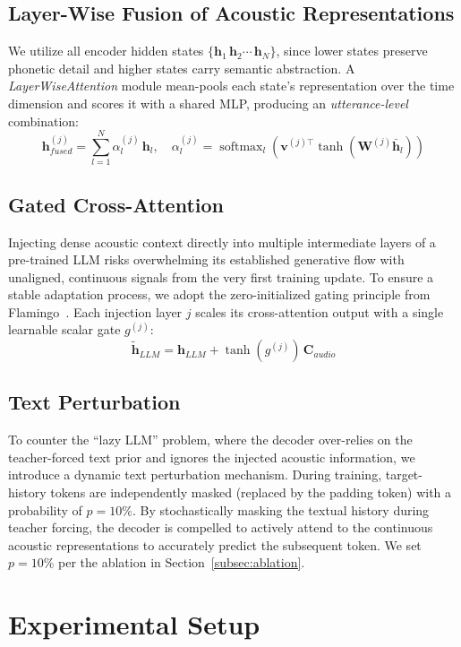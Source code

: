 \documentclass{article}
\begin{document}
\subsection{Layer-Wise Fusion of Acoustic Representations}
\noindent
We utilize all encoder hidden states $\{\boldsymbol{h}_1 \, \boldsymbol{h}_2 \cdots \, \boldsymbol{h}_N\}$, since lower states preserve phonetic detail and higher states carry semantic abstraction. A \textit{LayerWiseAttention} module mean-pools each state's representation over the time dimension and scores it with a shared MLP, producing an \emph{utterance-level} combination: $$\boldsymbol{h}_{fused}^{(j)} = \sum_{l=1}^{N} \alpha_{l}^{(j)}\, \boldsymbol{h}_{l}, \quad \alpha_{l}^{(j)} = \operatorname{softmax}_{l}\!\left(\boldsymbol{v}^{(j)\top}\tanh(\boldsymbol{W}^{(j)}\bar{\boldsymbol{h}}_{l})\right)$$

\subsection{Gated Cross-Attention}
\noindent
Injecting dense acoustic context directly into multiple intermediate layers of a pre-trained LLM risks overwhelming its established generative flow with unaligned, continuous signals from the very first training update. To ensure a stable adaptation process, we adopt the zero-initialized gating principle from Flamingo~\cite{alayrac2022flamingovisuallanguagemodel}. Each injection layer $j$ scales its cross-attention output with a single learnable scalar gate $g^{(j)}$: $$\tilde{\boldsymbol{h}}_{LLM} = \boldsymbol{h}_{LLM} + \tanh\!\left(g^{(j)}\right) \, \boldsymbol{C}_{audio}$$

\subsection{Text Perturbation}
\noindent
To counter the ``lazy LLM'' problem, where the decoder over-relies on the teacher-forced text prior and ignores the injected acoustic information, we introduce a dynamic text perturbation mechanism. During training, target-history tokens are independently masked (replaced by the padding token) with a probability of $p=10\%$. By stochastically masking the textual history during teacher forcing, the decoder is compelled to actively attend to the continuous acoustic representations to accurately predict the subsequent token. We set $p=10\%$ per the ablation in Section~\ref{subsec:ablation}.

\section{Experimental Setup}
\label{sec:experiments}
\end{document}
